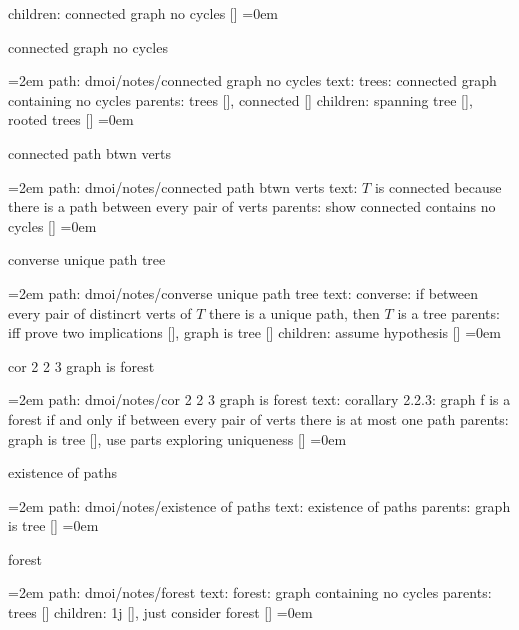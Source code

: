 \smallskip
children: connected graph no cycles []
\smallskip
\leftskip=0em
\par\endgroup
\bigskip
{}
connected graph no cycles
\smallskip
\par\begingroup
\leftskip=2em
path: dmoi/notes/connected graph no cycles
\smallskip
text:  trees: connected graph containing no cycles
\smallskip
parents:  trees [], connected []
\smallskip
children: spanning tree [], rooted trees []
\smallskip
\leftskip=0em
\par\endgroup
\bigskip
{}
connected path btwn verts
\smallskip
\par\begingroup
\leftskip=2em
path: dmoi/notes/connected path btwn verts
\smallskip
text:  $T$ is connected because there is a path between every pair of verts
\smallskip
parents:  show connected contains no cycles []
\smallskip
\leftskip=0em
\par\endgroup
\bigskip
{}
converse unique path tree
\smallskip
\par\begingroup
\leftskip=2em
path: dmoi/notes/converse unique path tree
\smallskip
text:  converse: if between every pair of distincrt verts of $T$ there is a unique path, then $T$ is a tree
\smallskip
parents:  iff prove two implications [], graph is tree []
\smallskip
children: assume hypothesis []
\smallskip
\leftskip=0em
\par\endgroup
\bigskip
{}
cor 2 2 3 graph is forest
\smallskip
\par\begingroup
\leftskip=2em
path: dmoi/notes/cor 2 2 3 graph is forest
\smallskip
text:  corallary 2.2.3: graph f is a forest if and only if between every pair of verts there is at most one path
\smallskip
parents:  graph is tree [], use parts exploring uniqueness []
\smallskip
\leftskip=0em
\par\endgroup
\bigskip
{}
existence of paths
\smallskip
\par\begingroup
\leftskip=2em
path: dmoi/notes/existence of paths
\smallskip
text:  existence of paths
\smallskip
parents:  graph is tree []
\smallskip
\leftskip=0em
\par\endgroup
\bigskip
{}
forest
\smallskip
\par\begingroup
\leftskip=2em
path: dmoi/notes/forest
\smallskip
text:  forest: graph containing no cycles
\smallskip
parents:  trees []
\smallskip
children: 1j [], just consider forest []
\smallskip
\leftskip=0em
